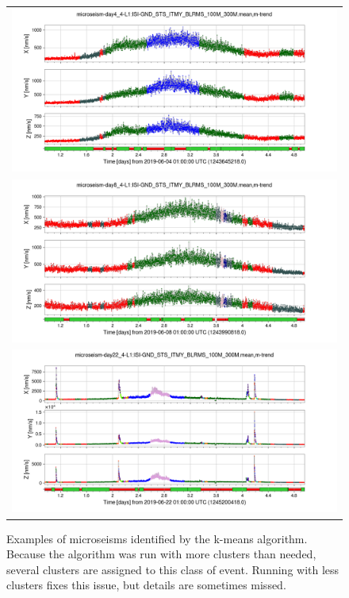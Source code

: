 \documentclass[colorlinks=true,pdfstartview=FitV,linkcolor=blue,
            citecolor=red,urlcolor=magenta]{ligodoc}
\begin{document}
\begin{figure}
  \begin{minipage}[c]{0.67\textwidth}
    \begin{tabular}{c}
      \includegraphics[width=\textwidth]{assets/report1/microseism-day4_4-L1:ISI-GND_STS_ITMY_BLRMS_100M_300Mmean,m-trend.png}\\
      \includegraphics[width=\textwidth]{assets/report1/microseism-day8_4-L1:ISI-GND_STS_ITMY_BLRMS_100M_300Mmean,m-trend.png}\\
      \includegraphics[width=\textwidth]{assets/report1/microseism-day22_4-L1:ISI-GND_STS_ITMY_BLRMS_100M_300Mmean,m-trend.png}
    \end{tabular}
  \end{minipage}\hfill
  \begin{minipage}[t]{0.3\textwidth}
    \caption{Examples of microseisms identified by the k-means algorithm. Because the algorithm was run with more clusters than needed, several clusters are assigned to this class of event. Running with less clusters fixes this issue, but details are sometimes missed.}
  \end{minipage}
\end{figure}
\end{document}
